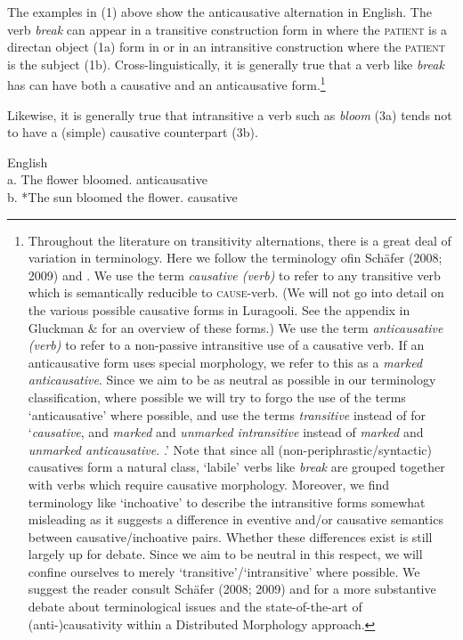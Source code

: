 \documentclass[output=paper]{langsci/langscibook}
\begin{document}
The examples in (1) above show the anticausative alternation in English. The verb \textit{break} can appear in a transitive construction form in where the \textsc{patient} is a directan object (1a) form in or in an intransitive construction where the \textsc{patient} is the subject (1b). Cross-linguistically, it is generally true that a verb like \textit{break} has can have both a causative and an anticausative form.\footnote{ Throughout the literature on transitivity alternations, there is a great deal of variation in terminology. Here we follow the terminology ofin Schäfer (2008; 2009) and \citet{AlexiadouEtAl2015}. We use the term \textit{causative (verb)} to refer to any transitive verb which is semantically reducible to \textsc{cause}{}-verb. (We will not go into detail on the various possible causative forms in Luragooli. See the appendix in Gluckman \& \citet{Bowler2015} for an overview of these forms.) We use the term \textit{anticausative (verb)} to refer to a non-passive intransitive use of a causative verb. If an anticausative form uses special morphology, we refer to this as a \textit{marked anticausative}. Since we aim to be as neutral as possible in our terminology classification, where possible we will try to forgo the use of the terms ‘anticausative’ where possible, and use the terms \textit{transitive} instead of for ‘\textit{causative}, and \textit{marked} and \textit{unmarked intransitive }instead of \textit{marked }and \textit{unmarked anticausative.} .’ Note that since all (non-periphrastic/syntactic) causatives form a natural class, ‘labile’ verbs like \textit{break} are grouped together with verbs which require causative morphology. Moreover, we find terminology like ‘inchoative’ \textit{ }to describe the intransitive forms somewhat misleading as it suggests a difference in eventive and/or causative semantics between causative/inchoative pairs. Whether these differences exist is still largely up for debate. Since we aim to be neutral in this respect, we will confine ourselves to merely ‘transitive’/‘intransitive’ where possible. We suggest the reader consult Schäfer (2008; 2009) and \citet{AlexiadouEtAl2015} for a more substantive debate about terminological issues and the state-of-the-art of (anti-)causativity within a Distributed Morphology approach.}%


 Likewise, it is generally true that intransitive a verb such as \textit{bloom} (3a) tends not to have a (simple) causative counterpart (3b).


\ea
{  English}\\
a.  The flower bloomed.        anticausative\\
b.  *The sun bloomed the flower.      causative\\
\z
\end{document}
